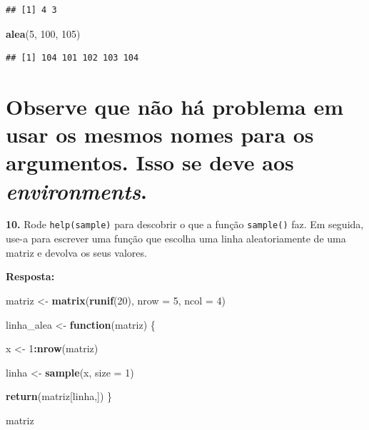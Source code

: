 \documentclass[
]{book}
\newenvironment{Shaded}{\begin{snugshade}}{\end{snugshade}}
\newcommand{\ControlFlowTok}[1]{\textcolor[rgb]{0.13,0.29,0.53}{\textbf{#1}}}
\newcommand{\DataTypeTok}[1]{\textcolor[rgb]{0.13,0.29,0.53}{#1}}
\newcommand{\DecValTok}[1]{\textcolor[rgb]{0.00,0.00,0.81}{#1}}
\newcommand{\KeywordTok}[1]{\textcolor[rgb]{0.13,0.29,0.53}{\textbf{#1}}}
\newcommand{\NormalTok}[1]{#1}
\newcommand{\OperatorTok}[1]{\textcolor[rgb]{0.81,0.36,0.00}{\textbf{#1}}}
\newcommand{\StringTok}[1]{\textcolor[rgb]{0.31,0.60,0.02}{#1}}
\begin{document}
\begin{verbatim}
## [1] 4 3
\end{verbatim}

\begin{Shaded}
\begin{Highlighting}[]
\KeywordTok{alea}\NormalTok{(}\DecValTok{5}\NormalTok{, }\DecValTok{100}\NormalTok{, }\DecValTok{105}\NormalTok{)}
\end{Highlighting}
\end{Shaded}

\begin{verbatim}
## [1] 104 101 102 103 104
\end{verbatim}

\hypertarget{observe-que-nuxe3o-huxe1-problema-em-usar-os-mesmos-nomes-para-os-argumentos.-isso-se-deve-aos-environments.}{%
\section{\texorpdfstring{Observe que não há problema em usar os mesmos nomes para os argumentos. Isso se deve aos \emph{environments}.}{Observe que não há problema em usar os mesmos nomes para os argumentos. Isso se deve aos environments.}}\label{observe-que-nuxe3o-huxe1-problema-em-usar-os-mesmos-nomes-para-os-argumentos.-isso-se-deve-aos-environments.}}

\textbf{10.} Rode \texttt{help(sample)} para descobrir o que a função \texttt{sample()} faz. Em seguida, use-a para escrever uma função que escolha uma linha aleatoriamente de uma matriz e devolva os seus valores.

\textbf{Resposta:}

\begin{Shaded}
\begin{Highlighting}[]
\NormalTok{matriz <{-}}\StringTok{ }\KeywordTok{matrix}\NormalTok{(}\KeywordTok{runif}\NormalTok{(}\DecValTok{20}\NormalTok{), }\DataTypeTok{nrow =} \DecValTok{5}\NormalTok{, }\DataTypeTok{ncol =} \DecValTok{4}\NormalTok{)}

\NormalTok{linha\_alea <{-}}\StringTok{ }\ControlFlowTok{function}\NormalTok{(matriz) \{}
  
\NormalTok{  x <{-}}\StringTok{ }\DecValTok{1}\OperatorTok{:}\KeywordTok{nrow}\NormalTok{(matriz)}
  
\NormalTok{  linha <{-}}\StringTok{ }\KeywordTok{sample}\NormalTok{(x, }\DataTypeTok{size =} \DecValTok{1}\NormalTok{)}
  
  \KeywordTok{return}\NormalTok{(matriz[linha,])}
\NormalTok{\}}

\NormalTok{matriz}
\end{Highlighting}
\end{Shaded}
\end{document}
